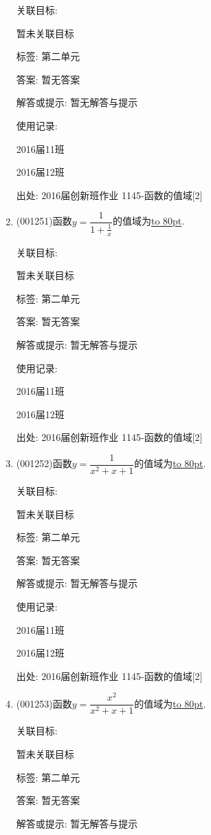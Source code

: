 \documentclass[10pt,a4paper]{article}
\newcommand{\blank}[1]{\underline{\hbox to #1pt{}}}
\begin{document}
\begin{enumerate}[1.]
关联目标:

暂未关联目标



标签: 第二单元

答案: 暂无答案

解答或提示: 暂无解答与提示

使用记录:

2016届11班	

2016届12班	


出处: 2016届创新班作业	1145-函数的值域[2]
\item { (001251)}函数$y=\dfrac{1}{1+\frac{1}{x}}$的值域为\blank{80}.


关联目标:

暂未关联目标



标签: 第二单元

答案: 暂无答案

解答或提示: 暂无解答与提示

使用记录:

2016届11班	

2016届12班	


出处: 2016届创新班作业	1145-函数的值域[2]
\item { (001252)}函数$y=\dfrac{1}{x^2+x+1}$的值域为\blank{80}.


关联目标:

暂未关联目标



标签: 第二单元

答案: 暂无答案

解答或提示: 暂无解答与提示

使用记录:

2016届11班	

2016届12班	


出处: 2016届创新班作业	1145-函数的值域[2]
\item { (001253)}函数$y=\dfrac{x^2}{x^2+x+1}$的值域为\blank{80}.


关联目标:

暂未关联目标



标签: 第二单元

答案: 暂无答案

解答或提示: 暂无解答与提示


\end{enumerate}
\end{document}
